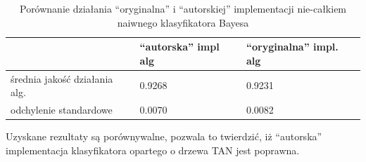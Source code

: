 \documentclass[paper=a4, fontsize=11pt]{scrartcl} %
\numberwithin{equation}{section} %
\numberwithin{figure}{section} %
\numberwithin{table}{section} %
\begin{document}
\begin{table}[h]
\caption{Porównanie działania "`oryginalna"'  i "`autorskiej"' implementacji nie-całkiem naiwnego klasyfikatora Bayesa} 
    \begin{tabular}{|l|l|l|}
    \hline
    ~                            & "`autorska"' impl alg & "`oryginalna"' impl. alg \\ \hline
    średnia jakość działania alg. & 0.9268               & 0.9231               \\ \hline
    odchylenie standardowe       & 0.0070               & 0.0082               \\ \hline
    \end{tabular}
\end{table}


Uzyskane rezultaty są porównywalne, pozwala to twierdzić, iż "`autorska"' implementacja klasyfikatora opartego o drzewa TAN jest poprawna.



\nocite{*}

 
\end{document}
